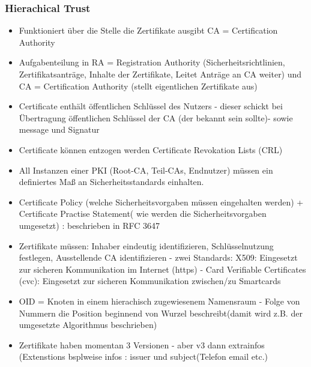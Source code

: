 \documentclass[a4paper,10pt]{scrartcl}
\begin{document}
         \subsubsection{ Hierachical Trust }
         \begin{itemize}
          \item Funktioniert über die Stelle die Zertifikate ausgibt CA = Certification Authority
          \item Aufgabenteilung in RA = Registration Authority (Sicherheitsrichtlinien, Zertifikatsanträge, Inhalte der Zertifikate, Leitet Anträge an CA weiter) und CA = Certification Authority
          (stellt eigentlichen Zertifikate aus)
          
          \item Certificate enthält öffentlichen Schlüssel des Nutzers - dieser schickt bei Übertragung
          öffentlichen Schlüssel der CA (der bekannt sein sollte)- sowie message und Signatur
          \item Certificate können entzogen werden Certificate Revokation Lists (CRL)
          \item All Instanzen einer PKI (Root-CA, Teil-CAs, Endnutzer) müssen ein definiertes Maß an
Sicherheitsstandards einhalten.
          \item Certificate Policy (welche Sicherheitsvorgaben müssen eingehalten werden) 
          + Certificate Practise Statement( wie werden die Sicherheitsvorgaben umgesetzt) : beschrieben in RFC 3647
          \item Zertifikate müssen: Inhaber eindeutig identifizieren, Schlüsselnutzung festlegen, Ausstellende CA identifizieren - zwei Standards:
          X509: Eingesetzt zur sicheren Kommunikation im Internet (https) - Card Verifiable Certificates (cvc): Eingesetzt zur sicheren Kommunikation
zwischen/zu Smartcards
           \item OID = Knoten in einem hierachisch zugewiesenem Namensraum - Folge von Nummern die Position beginnend von Wurzel beschreibt(damit wird z.B. der umgesetzte Algorithmus
           beschrieben)
           \item  Zertifikate haben momentan  3 Versionen - aber v3 dann extrainfos (Extenstions bsplweise infos : issuer und subject(Telefon email etc.)
          
         \end{itemize}


                
\end{document}
